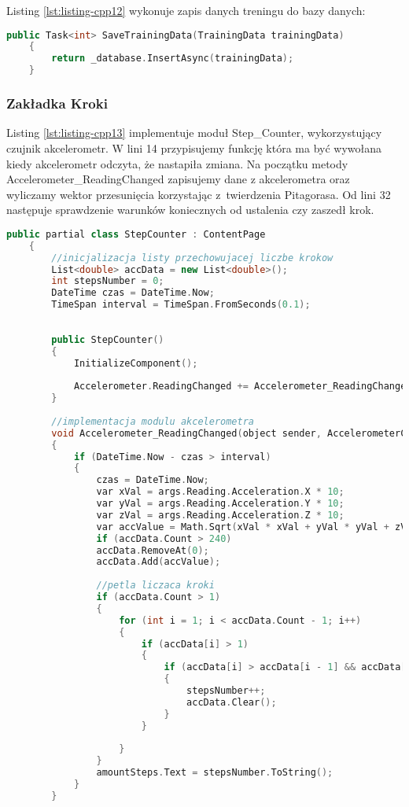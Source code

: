 Listing \ref{lst:listing-cpp12} wykonuje zapis danych treningu do bazy danych:
\begin{lstlisting}[caption=Zapis danych do bazy danych, label={lst:listing-cpp12}, language=C++]
	public Task<int> SaveTrainingData(TrainingData trainingData)      
	{
		return _database.InsertAsync(trainingData);
	}
\end{lstlisting}

\subsubsection{Zakładka Kroki} %

\hspace{0.60cm}Listing \ref{lst:listing-cpp13} implementuje moduł Step\_Counter, wykorzystujący czujnik akcelerometr. W lini 14 przypisujemy funkcję która ma być wywołana kiedy akcelerometr odczyta, że nastapiła zmiana. Na początku metody Accelerometer\_ReadingChanged zapisujemy dane z akcelerometra oraz wyliczamy wektor przesunięcia korzystając z~twierdzenia Pitagorasa. Od lini 32 następuje sprawdzenie warunków koniecznych od ustalenia czy zaszedł krok.
\begin{lstlisting}[caption=Krakomierz i akcelerometr, label={lst:listing-cpp13}, language=C++]
	public partial class StepCounter : ContentPage
	{
		//inicjalizacja listy przechowujacej liczbe krokow
		List<double> accData = new List<double>();
		int stepsNumber = 0;
		DateTime czas = DateTime.Now;
		TimeSpan interval = TimeSpan.FromSeconds(0.1);
		
		
		public StepCounter()
		{
			InitializeComponent();
			
			Accelerometer.ReadingChanged += Accelerometer_ReadingChanged;
		}
		
		//implementacja modulu akcelerometra
		void Accelerometer_ReadingChanged(object sender, AccelerometerChangedEventArgs args)
		{
			if (DateTime.Now - czas > interval)
			{
				czas = DateTime.Now;
				var xVal = args.Reading.Acceleration.X * 10;
				var yVal = args.Reading.Acceleration.Y * 10;
				var zVal = args.Reading.Acceleration.Z * 10;
				var accValue = Math.Sqrt(xVal * xVal + yVal * yVal + zVal * zVal) - 10;
				if (accData.Count > 240)
				accData.RemoveAt(0);
				accData.Add(accValue);
				
				//petla liczaca kroki
				if (accData.Count > 1)
				{
					for (int i = 1; i < accData.Count - 1; i++)
					{
						if (accData[i] > 1)
						{
							if (accData[i] > accData[i - 1] && accData[i] > accData[i + 1])
							{
								stepsNumber++;
								accData.Clear();
							}
						}
						
					}
				}
				amountSteps.Text = stepsNumber.ToString();
			}
		}
	\end{lstlisting}
	

